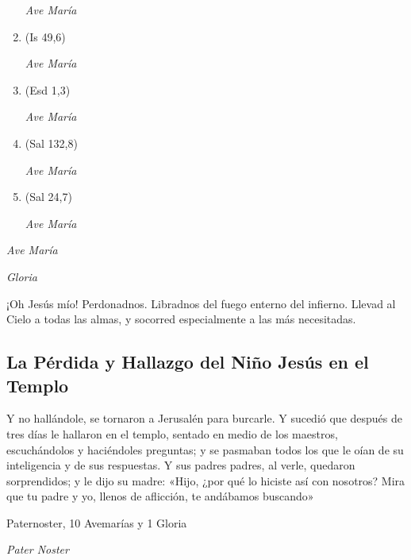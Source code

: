 \documentclass[a4paper,11pt, oneside]{report}
\begin{document}
\begin{enumerate}
          \textit{Ave María}

          \item (Is 49,6)
          

          \textit{Ave María}

          \item (Esd 1,3)
          
          \textit{Ave María}

          \item (Sal 132,8)
          
          \textit{Ave María}

          \item (Sal 24,7)
          
          \textit{Ave María}

        \end{enumerate}

        \textit{Ave María} \par
        \indent\textit{Gloria} \par
        
        \medskip
        ¡Oh Jesús mío! Perdonadnos. Libradnos del fuego enterno del infierno. Llevad al Cielo a todas las almas, y socorred especialmente a las más necesitadas.
              
      \subsection*{La Pérdida y Hallazgo del Niño Jesús en el Templo}
        Y no hallándole, se tornaron a Jerusalén para burcarle. Y sucedió que después de tres días le hallaron en el templo, sentado en medio de los maestros,
        escuchándolos y haciéndoles preguntas; y se pasmaban todos los que le oían de su inteligencia y de sus respuestas. Y sus padres padres, al verle, quedaron
        sorprendidos; y le dijo su madre: «Hijo, ¿por qué lo hiciste así con nosotros? Mira que tu padre y yo, llenos de aflicción, te andábamos buscando»
        
         Paternoster, 10 Avemarías y 1 Gloria
        
        \textit{Pater Noster}
\end{document}
